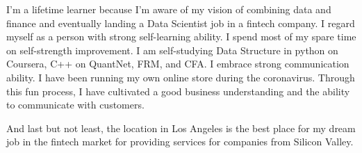 \documentclass[a4paper,english]{article}
\begin{document}
I'm a lifetime learner because I'm aware of my vision of combining data and finance and eventually landing a Data Scientist job in a fintech company. I regard myself as a person with strong self-learning ability. I spend most of my spare time on self-strength improvement. I am self-studying Data Structure in python on Coursera, C++ on QuantNet, FRM, and CFA. I embrace strong communication ability. I have been running my own online store during the coronavirus. Through this fun process, I have cultivated a good business understanding and the ability to communicate with customers.

And last but not least, the location in Los Angeles is the best place for my dream job in the fintech market for providing services for companies from Silicon Valley.
\end{document}
